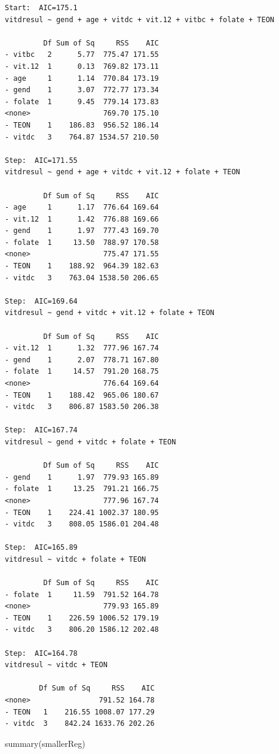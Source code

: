 \documentclass[
  oneside]{krantz}
\newenvironment{Shaded}{\begin{snugshade}}{\end{snugshade}}
\newcommand{\FunctionTok}[1]{\textcolor[rgb]{0.00,0.00,0.00}{#1}}
\newcommand{\NormalTok}[1]{#1}
\begin{document}
\begin{verbatim}
Start:  AIC=175.1
vitdresul ~ gend + age + vitdc + vit.12 + vitbc + folate + TEON

         Df Sum of Sq     RSS    AIC
- vitbc   2      5.77  775.47 171.55
- vit.12  1      0.13  769.82 173.11
- age     1      1.14  770.84 173.19
- gend    1      3.07  772.77 173.34
- folate  1      9.45  779.14 173.83
<none>                 769.70 175.10
- TEON    1    186.83  956.52 186.14
- vitdc   3    764.87 1534.57 210.50

Step:  AIC=171.55
vitdresul ~ gend + age + vitdc + vit.12 + folate + TEON

         Df Sum of Sq     RSS    AIC
- age     1      1.17  776.64 169.64
- vit.12  1      1.42  776.88 169.66
- gend    1      1.97  777.43 169.70
- folate  1     13.50  788.97 170.58
<none>                 775.47 171.55
- TEON    1    188.92  964.39 182.63
- vitdc   3    763.04 1538.50 206.65

Step:  AIC=169.64
vitdresul ~ gend + vitdc + vit.12 + folate + TEON

         Df Sum of Sq     RSS    AIC
- vit.12  1      1.32  777.96 167.74
- gend    1      2.07  778.71 167.80
- folate  1     14.57  791.20 168.75
<none>                 776.64 169.64
- TEON    1    188.42  965.06 180.67
- vitdc   3    806.87 1583.50 206.38

Step:  AIC=167.74
vitdresul ~ gend + vitdc + folate + TEON

         Df Sum of Sq     RSS    AIC
- gend    1      1.97  779.93 165.89
- folate  1     13.25  791.21 166.75
<none>                 777.96 167.74
- TEON    1    224.41 1002.37 180.95
- vitdc   3    808.05 1586.01 204.48

Step:  AIC=165.89
vitdresul ~ vitdc + folate + TEON

         Df Sum of Sq     RSS    AIC
- folate  1     11.59  791.52 164.78
<none>                 779.93 165.89
- TEON    1    226.59 1006.52 179.19
- vitdc   3    806.20 1586.12 202.48

Step:  AIC=164.78
vitdresul ~ vitdc + TEON

        Df Sum of Sq     RSS    AIC
<none>                791.52 164.78
- TEON   1    216.55 1008.07 177.29
- vitdc  3    842.24 1633.76 202.26
\end{verbatim}

\begin{Shaded}
\begin{Highlighting}[]
\FunctionTok{summary}\NormalTok{(smallerReg)}
\end{Highlighting}
\end{Shaded}
\end{document}
